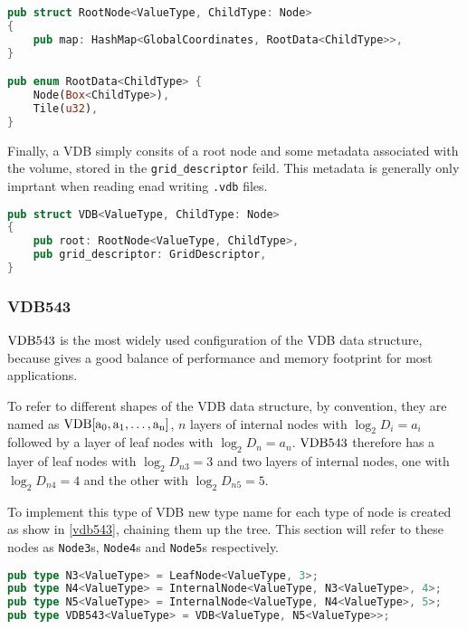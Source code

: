 \begin{lstlisting}[language=rust, captionpos=b, caption={
    \texttt{RootNode} definition. \texttt{RootData} is either a pointer to a child or a 4 bytes of data for a tile value.
  },label={code:root}]
pub struct RootNode<ValueType, ChildType: Node>
{
    pub map: HashMap<GlobalCoordinates, RootData<ChildType>>,
}

pub enum RootData<ChildType> {
    Node(Box<ChildType>),
    Tile(u32),
}
\end{lstlisting}

Finally, a VDB simply consits of a root node and some metadata associated with the volume, stored in the \verb|grid_descriptor| feild. This metadata is generally only imprtant when reading enad writing \verb|.vdb| files.

\begin{lstlisting}[language=rust, captionpos=b, caption={\texttt{VDB} definition}, label={vdb:def}]
pub struct VDB<ValueType, ChildType: Node>
{
    pub root: RootNode<ValueType, ChildType>,
    pub grid_descriptor: GridDescriptor,
}
\end{lstlisting}

\subsubsection{VDB543}
$\rm{VDB}543$ is the most widely used configuration of the VDB data structure, because gives a good balance of performance and memory footprint for most applications.
\begin{sloppypar}
  To refer to different shapes of the VDB data structure, by convention, they are named as ${\rm{VDB}[a_{0},a_{1},\dots, a_{n}]}$, $n$ layers of internal nodes with $\log_{2}D_{i}=a_{i}$ followed by a layer of leaf nodes with $\log_{2}D_{n}=a_{n}$. $\rm{VDB}543$ therefore has a layer of leaf nodes with $\log_{2}D_{n3} = 3$ and two layers of internal nodes, one with $\log_{2}D_{n4} = 4$ and the other with $\log_{2}D_{n5} = 5$.
\end{sloppypar}

To implement this type of VDB new type name for each type of node is created as show in \cref{vdb543}, chaining them up the tree. This section will refer to these nodes as \texttt{Node3}s, \texttt{Node4}s and \texttt{Node5}s respectively.

\begin{lstlisting}[language=rust, captionpos=b, caption={\texttt{VDB543} definition}, label={vdb543}]
pub type N3<ValueType> = LeafNode<ValueType, 3>;
pub type N4<ValueType> = InternalNode<ValueType, N3<ValueType>, 4>;
pub type N5<ValueType> = InternalNode<ValueType, N4<ValueType>, 5>;
pub type VDB543<ValueType> = VDB<ValueType, N5<ValueType>>;
\end{lstlisting}


